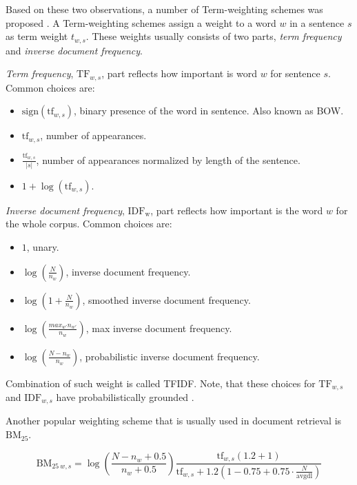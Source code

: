     Based on these two observations, a number of Term-weighting schemes was proposed \cite{salton1988term}.
    A Term-weighting schemes assign a weight to a word $w$ in a sentence $s$ as term weight $t_{w,s}$.
    These weights usually consists of two parts, \emph{term frequency} and \emph{inverse document frequency}. 
    
    \emph{Term frequency}, $\mathrm{TF}_{w,s}$, part reflects how important is word $w$ for sentence $s$.
    Common choices are:
    \begin{itemize}
        \item $\mathrm{sign}(\mathrm{tf}_{w,s})$, binary presence of the word in sentence. Also known as BOW.
        \item $\mathrm{tf}_{w,s}$, number of appearances.
        \item $\frac{\mathrm{tf}_{w,s}}{|s|}$, number of appearances normalized by length of the sentence.
        \item $1+\log(\mathrm{tf}_{w,s})$.
    \end{itemize}
    
    \emph{Inverse document frequency}, $\mathrm{IDF_w}$, part reflects how important is the word $w$ for the whole corpus.
    Common choices are:
    \begin{itemize}
        \item $1$, unary.
        \item $\log \left(\frac{N}{n_w} \right)$, inverse document frequency.
        \item $\log \left( 1+\frac{N}{n_w} \right)$, smoothed inverse document frequency.
        \item $\log \left( \frac{max_{w'} n_{w'}}{n_w} \right)$, max inverse document frequency.
        \item $\log \left(\frac{N-n_w}{n_w} \right)$, probabilistic inverse document frequency.
    \end{itemize}

    Combination of such weight is called TFIDF.
    Note, that these choices for $\mathrm{TF}_{w,s}$ and $\mathrm{IDF}_{w,s}$ have probabilistically grounded \cite{aizawa2003information}. %
    
    Another popular weighting scheme that is usually used in document retrieval is $\mathrm{BM_{25}}$. 
    
    $$\mathrm{BM}_{25~w,s} = \log \left(\frac{N-n_w+0.5}{n_w + 0.5}\right)    \frac{\mathrm{tf}_{w,s} (1.2 + 1)}{\mathrm{tf}_{w,s} + 1.2  \left(1 - 0.75 + 0.75 \cdot \frac{N}{\text{avgdl}}\right)}$$
    
